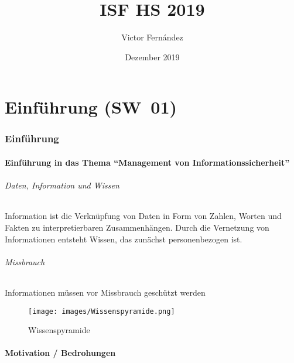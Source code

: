 \documentclass[10pt,a4paper]{article}
\title{ISF HS 2019}
\author{Victor Fernández}
\date{Dezember 2019}
\begin{document}
\maketitle
\thispagestyle{empty}
\tableofcontents
\thispagestyle{empty}
\pagebreak

\part{Einführung (SW~01)}
\section{Einführung}
\subsection*{Einführung in das Thema "`Management von Informationssicherheit"'}
\paragraph*{Daten, Information und Wissen}
Information ist die Verknüpfung von Daten in Form von Zahlen, Worten und Fakten zu interpretierbaren Zusammenhängen.
Durch die Vernetzung von Informationen entsteht Wissen, das zunächst personenbezogen ist.
\paragraph*{Missbrauch}Informationen müssen vor Missbrauch geschützt werden
\begin{figure}[h]
    \begin{center}
    \texttt{[image: images/Wissenspyramide.png]}
    \caption{Wissenspyramide}
    \label{Wissenspyramide}
    \end{center}
\end{figure}


\subsection*{Motivation / Bedrohungen}
\end{document}
